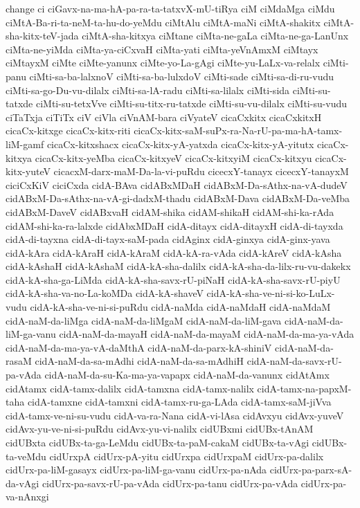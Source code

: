 {change
ci
ciGavx-na-ma-hA-pa-ra-ta-tatxvX-mU-tiRya
ciM
ciMdaMga
ciMdu
ciMtA-Ba-ri-ta-neM-ta-hu-do-yeMdu
ciMtAlu
ciMtA-maNi
ciMtA-shakitx
ciMtA-sha-kitx-teV-jada
ciMtA-sha-kitxya
ciMtane
ciMta-ne-gaLa
ciMta-ne-ga-LanUnx
ciMta-ne-yiMda
ciMta-ya-ciCxvaH
ciMta-yati
ciMta-yeVnAmxM
ciMtayx
ciMtayxM
ciMte
ciMte-yanunx
ciMte-yo-La-gAgi
ciMte-yu-LaLx-va-relalx
ciMti-panu
ciMti-sa-ba-lalxnoV
ciMti-sa-ba-lulxdoV
ciMti-sade
ciMti-sa-di-ru-vudu
ciMti-sa-go-Du-vu-dilalx
ciMti-sa-lA-radu
ciMti-sa-lilalx
ciMti-sida
ciMti-su-tatxde
ciMti-su-tetxVve
ciMti-su-titx-ru-tatxde
ciMti-su-vu-dilalx
ciMti-su-vudu
ciTaTxja
ciTiTx
ciV
ciVla
ciVnAM-bara
ciVyateV
cicaCxkitx
cicaCxkitxH
cicaCx-kitxge
cicaCx-kitx-riti
cicaCx-kitx-saM-suPx-ra-Na-rU-pa-ma-hA-tamx-liM-gamf
cicaCx-kitxshacx
cicaCx-kitx-yA-yatxda
cicaCx-kitx-yA-yitutx
cicaCx-kitxya
cicaCx-kitx-yeMba
cicaCx-kitxyeV
cicaCx-kitxyiM
cicaCx-kitxyu
cicaCx-kitx-yuteV
cicacxM-darx-maM-Da-la-vi-puRdu
cicecxY-tanayx
cicecxY-tanayxM
ciciCxKiV
ciciCxda
cidA-BAva
cidABxMDaH
cidABxM-Da-sAthx-na-vA-dudeV
cidABxM-Da-sAthx-na-vA-gi-dadxM-thadu
cidABxM-Dava
cidABxM-Da-veMba
cidABxM-DaveV
cidABxvaH
cidAM-shika
cidAM-shikaH
cidAM-shi-ka-rAda
cidAM-shi-ka-ra-lalxde
cidAbxMDaH
cidA-ditayx
cidA-ditayxH
cidA-di-tayxda
cidA-di-tayxna
cidA-di-tayx-saM-pada
cidAginx
cidA-ginxya
cidA-ginx-yava
cidA-kAra
cidA-kAraH
cidA-kAraM
cidA-kA-ra-vAda
cidA-kAreV
cidA-kAsha
cidA-kAshaH
cidA-kAshaM
cidA-kA-sha-dalilx
cidA-kA-sha-da-lilx-ru-vu-dakekx
cidA-kA-sha-ga-LiMda
cidA-kA-sha-savx-rU-piNaH
cidA-kA-sha-savx-rU-piyU
cidA-kA-sha-va-no-La-koMDa
cidA-kA-shaveV
cidA-kA-sha-ve-ni-si-ko-LuLx-vudu
cidA-kA-sha-ve-ni-si-puRdu
cidA-naMda
cidA-naMdaH
cidA-naMdaM
cidA-naM-da-liMga
cidA-naM-da-liMgaM
cidA-naM-da-liM-gava
cidA-naM-da-liM-ga-vanu
cidA-naM-da-mayaH
cidA-naM-da-mayaM
cidA-naM-da-ma-ya-vAda
cidA-naM-da-ma-ya-vA-daMthA
cidA-naM-da-parx-kA-shiniV
cidA-naM-da-rasaM
cidA-naM-da-sa-mAdhi
cidA-naM-da-sa-mAdhiH
cidA-naM-da-savx-rU-pa-vAda
cidA-naM-da-su-Ka-ma-ya-vapapx
cidA-naM-da-vanunx
cidAtAmx
cidAtamx
cidA-tamx-dalilx
cidA-tamxna
cidA-tamx-nalilx
cidA-tamx-na-papxM-taha
cidA-tamxne
cidA-tamxni
cidA-tamx-ru-ga-LAda
cidA-tamx-saM-jiVva
cidA-tamx-ve-ni-su-vudu
cidA-va-ra-Nana
cidA-vi-lAsa
cidAvxyu
cidAvx-yuveV
cidAvx-yu-ve-ni-si-puRdu
cidAvx-yu-vi-nalilx
cidUBxmi
cidUBx-tAnAM
cidUBxta
cidUBx-ta-ga-LeMdu
cidUBx-ta-paM-cakaM
cidUBx-ta-vAgi
cidUBx-ta-veMdu
cidUrxpA
cidUrx-pA-yitu
cidUrxpa
cidUrxpaM
cidUrx-pa-dalilx
cidUrx-pa-liM-gasayx
cidUrx-pa-liM-ga-vanu
cidUrx-pa-nAda
cidUrx-pa-parx-sA-da-vAgi
cidUrx-pa-savx-rU-pa-vAda
cidUrx-pa-tanu
cidUrx-pa-vAda
cidUrx-pa-va-nAnxgi
}
